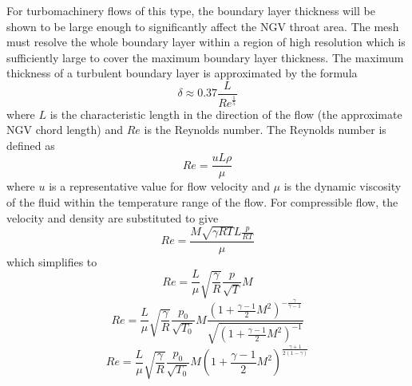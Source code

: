 \documentclass[a4paper, 11pt, oneside]{report}
\begin{document}
For turbomachinery flows of this type, the boundary layer thickness will be shown to be large enough to significantly affect the NGV throat area. The mesh must resolve the whole boundary layer within a region of high resolution which is sufficiently large to cover the maximum boundary layer thickness. The maximum thickness of a turbulent boundary layer is approximated by the formula
\begin{equation}\label{boundary_layer_thickness}
\delta \approx
0.37
\frac{L}{Re^\frac{1}{5}}
\end{equation}
where $L$ is the characteristic length in the direction of the flow (the approximate NGV chord length) and $Re$ is the Reynolds number. The Reynolds number is defined as
\begin{equation}
Re = 
\frac{uL\rho}{\mu}
\end{equation}
where $u$ is a representative value for flow velocity and $\mu$ is the dynamic viscosity of the fluid within the temperature range of the flow. For compressible flow, the velocity and density are substituted to give
\begin{equation}
Re = 
\frac{
	M\sqrt{\gamma RT}L\frac{p}{RT}
}{
	\mu
}
\end{equation}
which simplifies to
\begin{equation}
Re =
\frac{L}{\mu}
\sqrt{\frac{\gamma}{R}}
\frac{p}{\sqrt{T}}
M
\end{equation}
\begin{equation}
Re =
\frac{L}{\mu}
\sqrt{\frac{\gamma}{R}}
\frac{p_0}{\sqrt{T_0}}
M
\frac{
	\left(
		1 + \frac{\gamma-1}{2}
		M^2
	\right)
	^{-\frac{\gamma}{\gamma-1}}
}{
	\sqrt{
		\left(
			1 + \frac{\gamma-1}{2}
			M^2
		\right)
		^{-1}
	}
}
\end{equation}
\begin{equation}\label{reynolds_number_compressible}
Re = 
\frac{L}{\mu}
\sqrt{\frac{\gamma}{R}}
\frac{p_0}{\sqrt{T_0}}
M
\left(
	1 +
	\frac{\gamma-1}{2}
	M^2
\right)
^{\frac{\gamma+1}{2(1-\gamma)}}
\end{equation}
\end{document}
